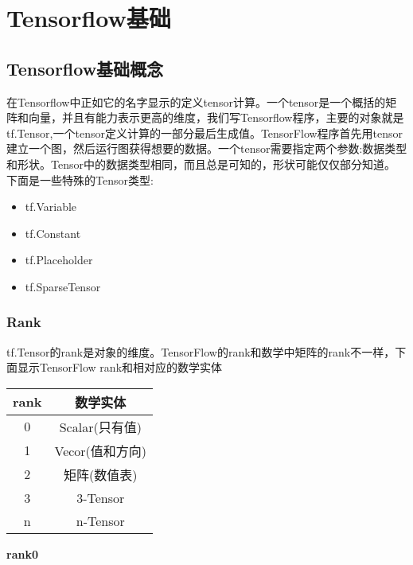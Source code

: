 \chapter{Tensorflow基础}
\section{Tensorflow基础概念}
在Tensorflow中正如它的名字显示的定义tensor计算。一个tensor是一个概括的矩阵和向量，并且有能力表示更高的维度，我们写Tensorflow程序，主要的对象就是tf.Tensor,一个tensor定义计算的一部分最后生成值。TensorFlow程序首先用tensor建立一个图，然后运行图获得想要的数据。一个tensor需要指定两个参数:数据类型和形状。Tensor中的数据类型相同，而且总是可知的，形状可能仅仅部分知道。
下面是一些特殊的Tensor类型:
\begin{itemize}
\item	tf.Variable
\item	tf.Constant
\item	tf.Placeholder
\item	tf.SparseTensor
\end{itemize}
\subsection{Rank}
tf.Tensor的rank是对象的维度。TensorFlow的rank和数学中矩阵的rank不一样，下面显示TensorFlow rank和相对应的数学实体
\begin{center}
\begin{tabular}{|c|c|}
\hline
rank&数学实体\\
\hline
0&Scalar(只有值)\\
\hline
1&Vecor(值和方向)\\
\hline
2&矩阵(数值表)\\
\hline
3&3-Tensor\\
\hline
n&n-Tensor\\
\hline
\end{tabular}
\end{center}
\textbf{rank0}

